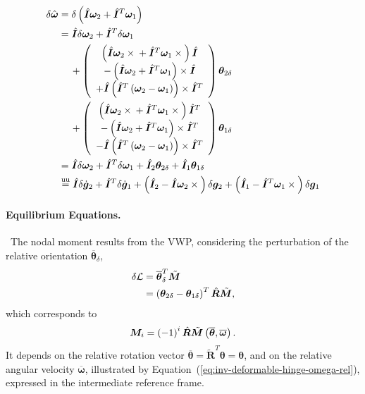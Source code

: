 \documentclass[10pt,dvips,fleqn,subeqn]{report}
\newcommand{\T}[1]{\bm{#1}}
\newcommand{\equu}{\overset{\text{uu}}{=}}
\begin{document}
\begin{align}
	\delta\hat{\T{\omega}} &= 
	\delta\plbr{
		\hat{\T{I}} \T{\omega}_2
		+ \hat{\T{I}}^T \T{\omega}_1
	} \nonumber \\
	&= \hat{\T{I}} \delta\T{\omega}_2
		+ \hat{\T{I}}^T \delta\T{\omega}_1
	\nonumber \\
	&\mbox{\hspace{12pt}}
	+ \plbr{\cvvect{
		\plbr{
			\hat{\T{I}} \T{\omega}_2 \times{}
			+ \hat{\T{I}}^T \T{\omega}_1 \times{}
		} \hat{\T{I}} \\
		- \plbr{
			\hat{\T{I}} \T{\omega}_2 + \hat{\T{I}}^T \T{\omega}_1
		} \times \hat{\T{I}} \\
		+ \hat{\T{I}} \plbr{
			\hat{\T{I}}^T \plbr{
				\T{\omega}_2 - \T{\omega}_1
			}
		}\times \hat{\T{I}}^T
	}} \T{\theta}_{2\delta} \nonumber \\
	&\mbox{\hspace{12pt}}
	+ \plbr{\cvvect{
		\plbr{
			\hat{\T{I}} \T{\omega}_2 \times{}
			+ \hat{\T{I}}^T \T{\omega}_1 \times{}
		} \hat{\T{I}}^T \\
		- \plbr{
			\hat{\T{I}} \T{\omega}_2 + \hat{\T{I}}^T \T{\omega}_1
		} \times \hat{\T{I}}^T \\
		- \hat{\T{I}} \plbr{
			\hat{\T{I}}^T \plbr{
				\T{\omega}_2 - \T{\omega}_1
			}
		}\times \hat{\T{I}}^T
	}} \T{\theta}_{1\delta} \nonumber \\
	&= \hat{\T{I}} \delta\T{\omega}_2
		+ \hat{\T{I}}^T \delta\T{\omega}_1
	+ \hat{\T{I}}_2 \T{\theta}_{2\delta}
	+ \hat{\T{I}}_1 \T{\theta}_{1\delta} \nonumber \\
	&\equu
	\hat{\T{I}} \delta\dot{\T{g}}_2
		+ \hat{\T{I}}^T \delta\dot{\T{g}}_1
	+ \plbr{\hat{\T{I}}_2 - \hat{\T{I}} \T{\omega}_2\times{}}
		\delta\T{g}_2
	+ \plbr{\hat{\T{I}}_1 - \hat{\T{I}}^T \T{\omega}_1\times{}}
		\delta\T{g}_1
	\label{eq:deformable-displacement-invariant-delta-hat-omega}
\end{align}




\paragraph{Equilibrium Equations.} \
The nodal moment results from the VWP, considering the perturbation 
of the relative orientation $\overline{\T{\theta}}_{\delta}$,
\begin{align}
	\delta\mathcal{L}
	& = \overline{\T{\theta}}_{\delta}^T \tilde{\T{M}} \nonumber \\
	&= \plbr{
		\T{\theta}_{2\delta} - \T{\theta}_{1\delta}
	}^T \hat{\T{R}} \tilde{\T{M}} ,
\end{align}
which corresponds to
\begin{equation}
	\T{M}_i = \plbr{-1}^i \hat{\T{R}}
		\tilde{\T{M}}\plbr{\overline{\T{\theta}}, \overline{\T{\omega}}} .
\end{equation}
It depends on the relative rotation vector
$\overline{\T{\theta}}=\tilde{\T{R}}^T\T{\theta}=\T{\theta}$,
and on the relative angular velocity $\overline{\T{\omega}}$,
illustrated by Equation~(\ref{eq:inv-deformable-hinge-omega-rel}),
expressed in the intermediate reference frame.
\end{document}

